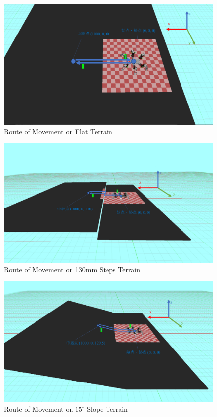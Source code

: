 \newpage

\begin{figure}[htbp]
  \begin{center}
    \includegraphics[width=0.7\linewidth,trim={0 50 0 0}, clip]{figure/chapter4/integration_flat_map.png}
    \caption{Route of Movement on Flat Terrain}
    \label{fig:ch4_integration_flat_map}  %
  \end{center}
\end{figure}

\begin{figure}[htbp]
  \begin{center}
    \includegraphics[width=0.7\linewidth,trim={50 50 50 50}, clip]{figure/chapter4/integration_130mm_map.png}
    \caption{Route of Movement on 130mm Steps Terrain}
    \label{fig:ch4_integration_130mm_map}  %
  \end{center}
\end{figure}

\begin{figure}[htbp]
  \begin{center}
    \includegraphics[width=0.7\linewidth,trim={50 50 50 50}, clip]{figure/chapter4/integration_15deg_map.png}
    \caption{Route of Movement on $15^{\circ}$ Slope Terrain}
    \label{fig:ch4_integration_15deg_map}  %
  \end{center}
\end{figure}

